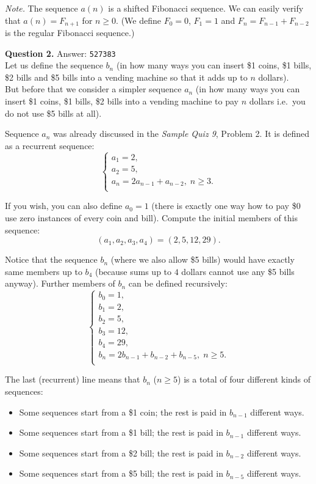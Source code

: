 \documentclass[jou]{apa6}
\begin{document}
{\em Note.} The sequence $a(n)$ is a shifted Fibonacci sequence. 
We can easily verify that $a(n) = F_{n+1}$ for $n \geq 0$.
(We define $F_0 = 0$, $F_1 = 1$ and $F_{n} = F_{n-1} + F_{n-2}$ 
is the regular Fibonacci sequence.)

\vspace{6pt}
{\bf Question 2.} Answer: {\tt 527383}\\
Let us define the sequence $b_n$ (in how many ways you can 
insert \$1 coins, \$1 bills, \$2 bills and \$5 bills into a vending 
machine so that it adds up to $n$ dollars).\\
But before that we consider a simpler sequence $a_n$ (in how many ways you can 
insert \$1 coins, \$1 bills, \$2 bills into a vending machine to pay $n$ dollars \textendash{}
i.e.\ you do not use \$5 bills at all). 

Sequence $a_n$ was already discussed in the {\em Sample Quiz 9}, Problem 2. 
It is defined as a recurrent sequence:
$$\left\{ \begin{array}{l}
a_1 = 2, \\
a_2 = 5, \\
a_{n} = 2a_{n-1} + a_{n-2},\;n \geq 3.\\
\end{array} \right.$$

If you wish, you can also define $a_0 = 1$ (there is exactly one way how to pay \$0 \textendash{}
use zero instances of every coin and bill). Compute the initial members of this sequence:
$$(a_1,a_2,a_3,a_4) = (2,5,12,29).$$

Notice that the sequence $b_n$ (where we also allow \$5 bills) would have exactly same 
members up to $b_4$ (because sums up to $4$ dollars cannot use any \$5 bills anyway).
Further members of $b_n$ can be defined recursively:
$$\left\{ \begin{array}{l}
b_0 = 1,\\
b_1 = 2,\\
b_2 = 5,\\
b_3 = 12,\\
b_4 = 29,\\
b_n = 2b_{n-1} + b_{n-2} + b_{n-5},\;n \geq 5.\\
\end{array} \right.$$

The last (recurrent) line means that $b_n$ ($n \geq 5$) is a total of four different kinds of sequences:
\begin{itemize}
\item Some sequences start from a \$1 coin; the rest is paid in $b_{n-1}$ different ways.
\item Some sequences start from a \$1 bill; the rest is paid in $b_{n-1}$ different ways.
\item Some sequences start from a \$2 bill; the rest is paid in $b_{n-2}$ different ways.
\item Some sequences start from a \$5 bill; the rest is paid in $b_{n-5}$ different ways.
\end{itemize}
\end{document}
